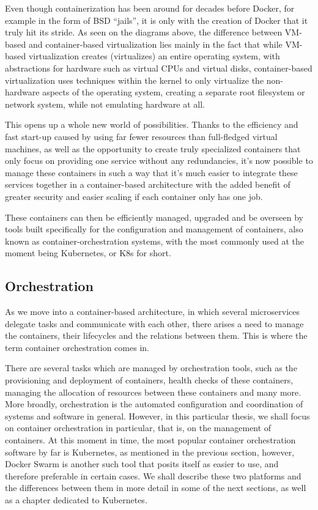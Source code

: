\documentclass[thesis=B,english]{FITthesis}[2019/12/23]
\begin{document}
Even though containerization has been around for decades before Docker, for example in the form of BSD “jails”, it is only with the creation of Docker that it truly hit its stride. As seen on the diagrams above, the difference between VM-based and container-based virtualization lies mainly in the fact that while VM-based virtualization creates (virtualizes) an entire operating system, with abstractions for hardware such as virtual CPUs and virtual disks, container-based virtualization uses techniques within the kernel to only virtualize the non-hardware aspects of the operating system, creating a separate root filesystem or network system, while not emulating hardware at all. \cite{virtualization}

This opens up a whole new world of possibilities. Thanks to the efficiency and fast start-up caused by using far fewer resources than full-fledged virtual machines, as well as the opportunity to create truly specialized containers that only focus on providing one service without any redundancies, it’s now possible to manage these containers in such a way that it’s much easier to integrate these services together in a container-based architecture with the added benefit of greater security and easier scaling if each container only has one job.

These containers can then be efficiently managed, upgraded and be overseen by tools built specifically for the configuration and management of containers, also known as container-orchestration systems, with the most commonly used at the moment being Kubernetes, or K8s for short.


\subsection{Orchestration}

As we move into a container-based architecture, in which several microservices delegate tasks and communicate with each other, there arises a need to manage the containers, their lifecycles and the relations between them. This is where the term container orchestration comes in.

There are several tasks which are managed by orchestration tools, such as the provisioning and deployment of containers, health checks of these containers, managing the allocation of resources between these containers and many more. More broadly, orchestration is the automated configuration and coordination of systems and software in general. However, in this particular thesis, we shall focus on container orchestration in particular, that is, on the management of containers. At this moment in time, the most popular container orchestration software by far is Kubernetes, as mentioned in the previous section, however, Docker Swarm is another such tool that posits itself as easier to use, and therefore preferable in certain cases. \cite{docker-orchestration} We shall describe these two platforms and the differences between them in more detail in some of the next sections, as well as a chapter dedicated to Kubernetes.
\end{document}

